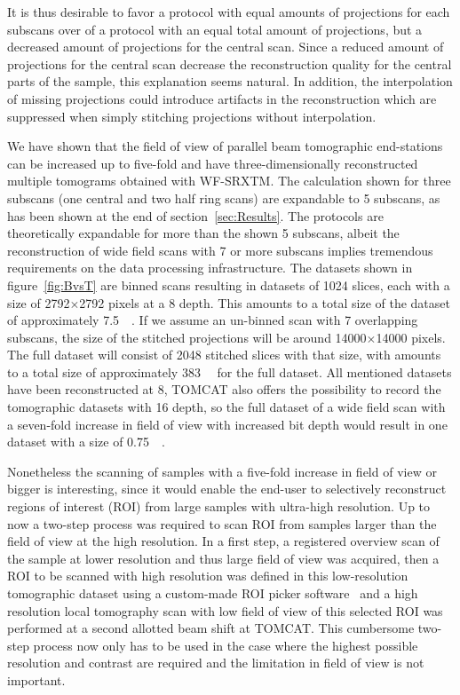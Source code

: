 It is thus desirable to favor a protocol with equal amounts of projections for each subscans over of a protocol with an equal total amount of projections, but a decreased amount of projections for the central scan. Since a reduced amount of projections for the central scan decrease the reconstruction quality for the central parts of the sample, this explanation seems natural. In addition, the interpolation of missing projections could introduce artifacts in the reconstruction which are suppressed when simply stitching projections without interpolation.

We have shown that the field of view of parallel beam tomographic end-stations can be increased up to five-fold and have three-dimensionally reconstructed multiple tomograms obtained with WF-SRXTM. The calculation shown for three subscans (one central and two half ring scans) are expandable to 5 subscans, as has been shown at the end of section~\ref{sec:Results}. The protocols are theoretically expandable for more than the shown 5 subscans, albeit the reconstruction of wide field scans with 7 or more subscans implies tremendous requirements on the data processing infrastructure. The datasets shown in figure~\ref{fig:BvsT} are binned scans resulting in datasets of 1024 slices, each with a size of 2792$\times$2792 pixels at a \SI{8}{\bit} depth. This amounts to a total size of the dataset of approximately \SI{7.5}{\giga\byte}. If we assume an un-binned scan with 7 overlapping subscans, the size of the stitched projections will be around 14000$\times$14000 pixels. The full dataset will consist of 2048 stitched slices with that size, with amounts to a total size of approximately \SI{383}{\giga\byte} for the full dataset. All mentioned datasets have been reconstructed at \SI{8}{\bit}, TOMCAT also offers the possibility to record the tomographic datasets with \SI{16}{\bit} depth, so the full dataset of a wide field scan with a seven-fold increase in field of view with increased bit depth would result in one dataset with a size of \SI{0.75}{\tera\byte}.

Nonetheless the scanning of samples with a five-fold increase in field of view or bigger is interesting, since it would enable the end-user to selectively reconstruct regions of interest (ROI) from large samples with ultra-high resolution. Up to now a two-step process was required to scan ROI from samples larger than the field of view at the high resolution. In a first step, a registered overview scan of the sample at lower resolution and thus large field of view was acquired, then a ROI to be scanned with high resolution was defined in this low-resolution tomographic dataset using a custom-made ROI picker software~\cite{Heinzer2008} and a high resolution local tomography scan with low field of view of this selected ROI was performed at a second allotted beam shift at TOMCAT. This cumbersome two-step process now only has to be used in the case where the highest possible resolution and contrast are required and the limitation in field of view is not important.

